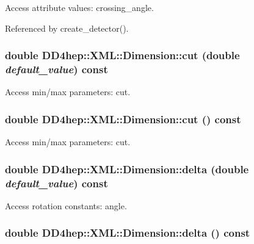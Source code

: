 Access attribute values: crossing\_\-angle. 

Referenced by create\_\-detector().\hypertarget{struct_d_d4hep_1_1_x_m_l_1_1_dimension_ab508a3c27899e395d3034b91f2852948}{
\subsubsection[{cut}]{\setlength{\rightskip}{0pt plus 5cm}double DD4hep::XML::Dimension::cut (double {\em default\_\-value}) const}}
\label{struct_d_d4hep_1_1_x_m_l_1_1_dimension_ab508a3c27899e395d3034b91f2852948}


Access min/max parameters: cut. \hypertarget{struct_d_d4hep_1_1_x_m_l_1_1_dimension_ab2a2eb4f9a96cd62c73ace982c917923}{
\subsubsection[{cut}]{\setlength{\rightskip}{0pt plus 5cm}double DD4hep::XML::Dimension::cut () const}}
\label{struct_d_d4hep_1_1_x_m_l_1_1_dimension_ab2a2eb4f9a96cd62c73ace982c917923}


Access min/max parameters: cut. \hypertarget{struct_d_d4hep_1_1_x_m_l_1_1_dimension_adb9ab339cb1e07633480c50bf8450b03}{
\subsubsection[{delta}]{\setlength{\rightskip}{0pt plus 5cm}double DD4hep::XML::Dimension::delta (double {\em default\_\-value}) const}}
\label{struct_d_d4hep_1_1_x_m_l_1_1_dimension_adb9ab339cb1e07633480c50bf8450b03}


Access rotation constants: angle. \hypertarget{struct_d_d4hep_1_1_x_m_l_1_1_dimension_a551b162ee5fcf0f8d01382714a93d82b}{
\subsubsection[{delta}]{\setlength{\rightskip}{0pt plus 5cm}double DD4hep::XML::Dimension::delta () const}}
\label{struct_d_d4hep_1_1_x_m_l_1_1_dimension_a551b162ee5fcf0f8d01382714a93d82b}


